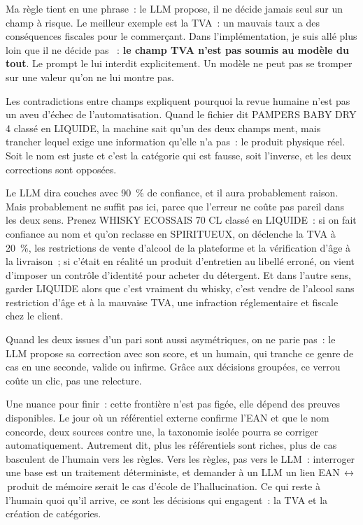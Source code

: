 \documentclass[11pt,a4paper]{article}
\begin{document}
Ma règle tient en une phrase~: le LLM propose, il ne décide jamais seul sur un champ à risque. Le
meilleur exemple est la TVA~: un mauvais taux a des conséquences fiscales pour le commerçant.
Dans l'implémentation, je suis allé plus loin que \guillemotleft{} il ne décide pas \guillemotright{}~: \textbf{le champ TVA n'est
pas soumis au modèle du tout}. Le prompt le lui interdit explicitement. Un modèle ne peut pas se
tromper sur une valeur qu'on ne lui montre pas.

Les contradictions entre champs expliquent pourquoi la revue humaine n'est pas un aveu d'échec
de l'automatisation. Quand le fichier dit
\guillemotleft{} PAMPERS BABY DRY 4 \guillemotright{} classé en LIQUIDE, la machine sait qu'un des deux champs ment,
mais trancher lequel exige une information qu'elle n'a pas~: le produit physique réel. Soit le nom
est juste et c'est la catégorie qui est fausse, soit l'inverse, et les deux corrections sont
opposées.

Le LLM dira \guillemotleft{} couches \guillemotright{} avec 90~\% de confiance, et il aura probablement raison. Mais
\guillemotleft{} probablement \guillemotright{} ne suffit pas ici, parce que l'erreur ne coûte pas pareil dans les deux sens.
Prenez \guillemotleft{} WHISKY ECOSSAIS 70 CL \guillemotright{} classé en LIQUIDE~: si on fait confiance au nom et qu'on reclasse
en SPIRITUEUX, on déclenche la TVA à 20~\%, les restrictions de vente d'alcool de la plateforme et
la vérification d'âge à la livraison~; si c'était en réalité un produit d'entretien au libellé
erroné, on vient d'imposer un contrôle d'identité pour acheter du détergent. Et dans l'autre sens,
garder LIQUIDE alors que c'est vraiment du whisky, c'est vendre de l'alcool sans restriction d'âge
et à la mauvaise TVA, une infraction réglementaire et fiscale chez le client.

Quand les deux issues d'un pari sont
aussi asymétriques, on ne parie pas~: le LLM propose sa correction avec son score, et un humain,
qui tranche ce genre de cas en une seconde, valide ou infirme. Grâce aux décisions groupées, ce
verrou coûte un clic, pas une relecture.

Une nuance pour finir~: cette frontière n'est pas figée,
elle dépend des preuves disponibles. Le jour où un référentiel externe confirme l'EAN et que le nom
concorde, deux sources contre une, la taxonomie isolée pourra se corriger automatiquement.
Autrement dit, plus les référentiels sont riches, plus de cas basculent de l'humain vers les
règles. Vers les règles, pas vers le LLM~: interroger une base est un traitement déterministe, et
demander à un LLM un lien EAN\,$\leftrightarrow$\,produit de mémoire serait le cas d'école de
l'hallucination. Ce qui reste à l'humain quoi qu'il arrive, ce sont les décisions qui engagent~:
la TVA et la création de catégories.
\end{document}
